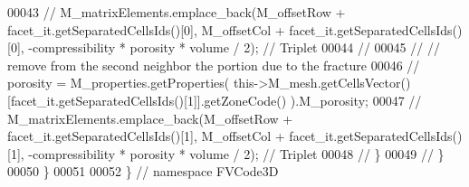 \begin{DoxyCode}
00043 \textcolor{comment}{//            M\_matrixElements.emplace\_back(M\_offsetRow + facet\_it.getSeparatedCellsIds()[0], M\_offsetCol +
       facet\_it.getSeparatedCellsIds()[0], -compressibility * porosity * volume / 2); // Triplet}
00044 \textcolor{comment}{//}
00045 \textcolor{comment}{//            // remove from the second neighbor the portion due to the fracture}
00046 \textcolor{comment}{//            porosity = M\_properties.getProperties(
       this->M\_mesh.getCellsVector()[facet\_it.getSeparatedCellsIds()[1]].getZoneCode() ).M\_porosity;}
00047 \textcolor{comment}{//            M\_matrixElements.emplace\_back(M\_offsetRow + facet\_it.getSeparatedCellsIds()[1], M\_offsetCol +
       facet\_it.getSeparatedCellsIds()[1], -compressibility * porosity * volume / 2); // Triplet}
00048 \textcolor{comment}{//        \}}
00049 \textcolor{comment}{//    \}}
00050 \}
00051 
00052 \} \textcolor{comment}{// namespace FVCode3D}
\end{DoxyCode}
